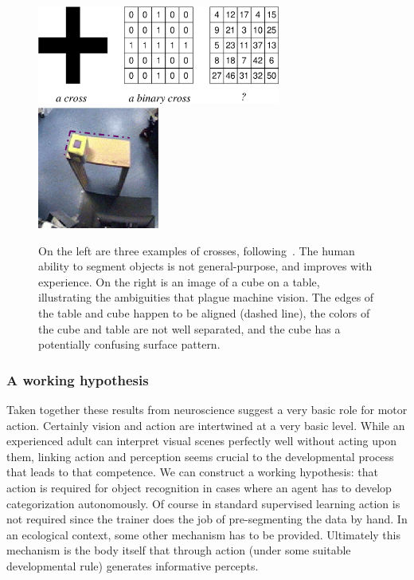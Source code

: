 %
\begin{figure}[tb]
\begin{center}
\includegraphics[width=8.0cm]{number-cross.eps}
\hspace{2cm}
\includegraphics[width=4cm]{setup-sequence.eps}
\caption{ 
\label{fig:number-cross}
%
On the left are three examples of crosses,
following~\cite{manzotti01coscienza}.  The human ability to segment
objects is not general-purpose, and improves with experience.
On the right is an image of a cube on a table, illustrating the
ambiguities that plague machine vision. 
The edges of the table and cube happen to be
aligned (dashed line), the colors of the cube and table are not well
separated, and the cube has a potentially confusing surface pattern.
%
}
\end{center}
\end{figure}
%
%

\fi



%
%
%







\subsubsection*{A working hypothesis}


Taken together these results from neuroscience suggest a very basic role
for motor action. Certainly vision and action are
intertwined at a very basic level.  While an
experienced adult can interpret visual scenes perfectly well without
acting upon them, linking action and perception seems crucial to the
developmental process that leads to that competence.  We can construct
a working hypothesis: that action is required for object recognition in
cases where an agent has to develop categorization autonomously. 
Of course in standard supervised learning action is not required since
the trainer does the job of pre-segmenting the data by hand.  In an
ecological context, some other mechanism has to be provided.
Ultimately this mechanism is the body itself that through action
(under some suitable developmental rule) generates informative
percepts.

